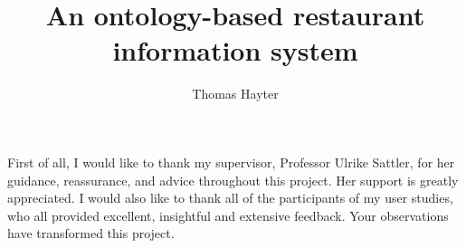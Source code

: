 \documentclass[12pt,BSc,wordcount,twoside]{muthesis}
\begin{document}

\title{An ontology-based restaurant information system}
\author{Thomas Hayter}

\beforeabstract



\afterabstract

First of all, I would like to thank my supervisor, Professor Ulrike Sattler, for her guidance, reassurance, and advice throughout this project. Her support is greatly appreciated.
I would also like to thank all of the participants of my user studies, who all provided excellent, insightful and extensive feedback. Your observations have transformed this project.
\afterpreface













\appendix





\end{document}
